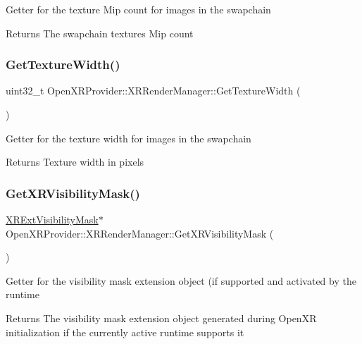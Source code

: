 Getter for the texture Mip count for images in the swapchain \begin{DoxyReturn}{Returns}
The swapchain textures\textquotesingle{} Mip count 
\end{DoxyReturn}
\mbox{\label{class_open_x_r_provider_1_1_x_r_render_manager_a6d9fe3b04d4786f66455cac3bd9fa115}} 
\subsubsection{\texorpdfstring{GetTextureWidth()}{GetTextureWidth()}}
{\footnotesize\ttfamily uint32\+\_\+t Open\+X\+R\+Provider\+::\+X\+R\+Render\+Manager\+::\+Get\+Texture\+Width (\begin{DoxyParamCaption}{ }\end{DoxyParamCaption})\hspace{0.3cm}{\ttfamily [inline]}}

Getter for the texture width for images in the swapchain \begin{DoxyReturn}{Returns}
Texture width in pixels 
\end{DoxyReturn}
\mbox{\label{class_open_x_r_provider_1_1_x_r_render_manager_a7bcc0021dd457e08fe53f7841d0c7c66}} 
\subsubsection{\texorpdfstring{GetXRVisibilityMask()}{GetXRVisibilityMask()}}
{\footnotesize\ttfamily \mbox{\hyperlink{class_open_x_r_provider_1_1_x_r_ext_visibility_mask}{X\+R\+Ext\+Visibility\+Mask}}$\ast$ Open\+X\+R\+Provider\+::\+X\+R\+Render\+Manager\+::\+Get\+X\+R\+Visibility\+Mask (\begin{DoxyParamCaption}{ }\end{DoxyParamCaption})\hspace{0.3cm}{\ttfamily [inline]}}

Getter for the visibility mask extension object (if supported and activated by the runtime \begin{DoxyReturn}{Returns}
The visibility mask extension object generated during Open\+XR initialization if the currently active runtime supports it 
\end{DoxyReturn}
\mbox{\label{class_open_x_r_provider_1_1_x_r_render_manager_aebe4bca3de5bdec26ea4dfbc641273b5}} 
